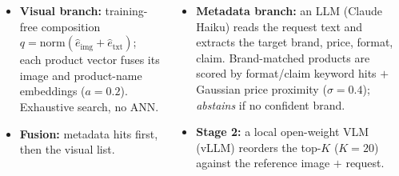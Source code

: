 \documentclass[25pt, a0paper, portrait, margin=0mm, innermargin=18mm,
               blockverticalspace=10mm, colspace=14mm, subcolspace=8mm]{tikzposter}
\begin{document}
\begin{columns}
{\raggedright
\begin{minipage}[t]{0.49\linewidth}
\begin{itemize}
  \item \textbf{Visual branch:} training-free composition
        $q=\mathrm{norm}(\hat e_\text{img}+\hat e_\text{txt})$; each product
        vector fuses its image and product-name embeddings ($a{=}0.2$).
        Exhaustive search, no ANN.
  \item \textbf{Fusion:} metadata hits first, then the visual list.
\end{itemize}
\end{minipage}\hfill
\begin{minipage}[t]{0.49\linewidth}
\begin{itemize}
  \item \textbf{Metadata branch:} an LLM (Claude Haiku) reads the request text
        and extracts the target brand, price, format, claim. Brand-matched
        products are scored by format/claim keyword hits $+$ Gaussian price
        proximity ($\sigma{=}0.4$); \emph{abstains} if no confident brand.
  \item \textbf{Stage 2:} a local open-weight VLM (vLLM) reorders the top-$K$
        ($K{=}20$) against the reference image $+$ request.
\end{itemize}
\end{minipage}
}

\end{columns}
\end{document}
